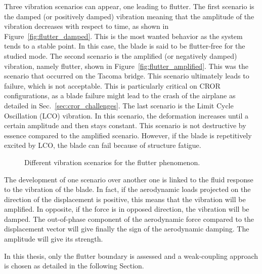 Three vibration scenarios can appear, one leading to flutter.
The first scenario is the damped (or positively damped) 
vibration meaning
that the amplitude of the vibration decreases with respect to time, 
as shown in Figure~\ref{fig:flutter_damped}.
This is the most wanted behavior as the system tends to
a stable point. In this case, the blade is said to
be flutter-free for the studied mode.
The second scenario is the amplified (or negatively damped)
vibration, namely flutter, shown in Figure~\ref{fig:flutter_amplified}. 
This was the scenario that occurred on the Tacoma bridge. 
This scenario ultimately
leads to failure, which is not acceptable. This is particularly critical
on CROR configurations, as a blade failure might lead to 
the crash of the airplane as detailed in Sec.~\ref{sec:cror_challenges}.
The last scenario is the Limit Cycle Oscillation (LCO) vibration.
In this scenario, the deformation increases until a certain 
amplitude and then stays constant. This scenario is not
destructive by essence compared to the amplified scenario. However,
if the blade is repetitively excited by LCO, the blade
can fail because of structure fatigue.
\begin{figure}[htp]
  \centering
  \caption{Different vibration scenarios for the flutter phenomenon.}
\end{figure}

The development of one scenario over another one is linked to
the fluid response to the vibration of the blade. In fact,
if the aerodynamic loads projected on the direction of the displacement
is positive, this means that the vibration will be amplified. 
In opposite, if the force is in opposed direction, the vibration will be damped.
The out-of-phase component of the aerodynamic force compared to
the displacement vector will give finally the sign of the aerodynamic damping.
The amplitude will give its strength. 

In this thesis, only the flutter boundary is assessed
and a weak-coupling approach is chosen
as detailed in the following Section.
